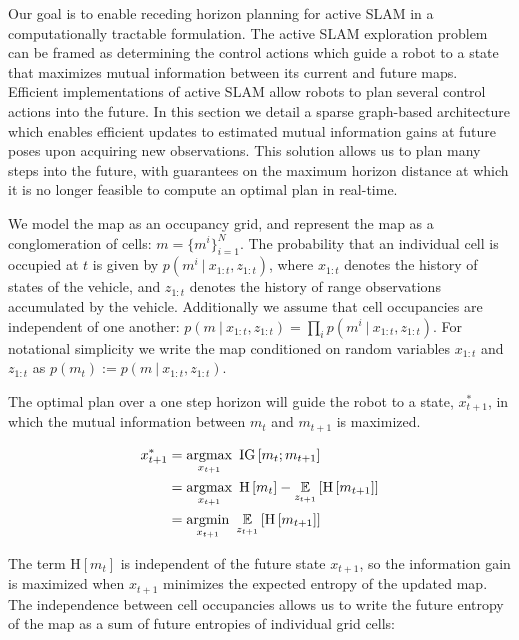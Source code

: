 \documentclass[conference]{IEEEtran}
\begin{document}
\iffalse
Our goal is to enable receding horizon planning for active SLAM in a computationally tractable formulation. The active SLAM exploration problem can be framed as determining the control actions which guide a robot to a state that maximizes mutual information between its current and future maps. Efficient implementations of active SLAM allow robots to plan several control actions into the future. In this section we detail a sparse graph-based architecture which enables efficient updates to estimated mutual information gains at future poses upon acquiring new observations. This solution allows us to plan many steps into the future, with guarantees on the maximum horizon distance at which it is no longer feasible to compute an optimal plan in real-time.

We model the map as an occupancy grid, and represent the map as a conglomeration of cells: $m = \{m^{i}\}_{i=1}^{N}$. The probability that an individual cell is occupied at $t$ is given by $p\left(m^{i} \ \vert \ x_{1:t}, z_{1:t}\right)$, where $x_{1:t}$ denotes the history of states of the vehicle, and $z_{1:t}$ denotes the history of range observations accumulated by the vehicle. Additionally we assume that cell occupancies  are independent of one another: $p\left(m \ \vert \ x_{1:t}, z_{1:t}\right) = \prod_{i} p\left(m^{i} \ \vert \ x_{1:t}, z_{1:t}\right)$. For notational simplicity we write the map conditioned on random variables $x_{1:t}$ and $z_{1:t}$ as $p\left(m_{t}\right) := p\left(m \ \vert \ x_{1:t}, z_{1:t}\right)$.

The optimal plan over a one step horizon will guide the robot to a state, $x_{t+1}^{*}$, in which the mutual information between $m_{t}$ and $m_{t+1}$ is maximized.

\begin{align} \begin{split}
  x_{t+1}^{*}
  &=
  \argmax_{x_{t+1}}
  \
  \text{IG}\left[
    m_{t}
    ;
    m_{t+1}
  \right]
  \\
  &=
  \argmax_{x_{t+1}}
  \
  \text{H}\left[
    m_{t}
  \right]
  -
  \expect_{z_{t+1}}\left[
    \text{H}\left[
      m_{t+1}
    \right]
  \right]
  \\
  &=
  \argmin_{x_{t+1}}
  \
  \expect_{z_{t+1}}\left[
    \text{H}\left[
      m_{t+1}
    \right]
  \right]
\end{split} \end{align}

The term $\text{H}\left[m_{t}\right]$ is independent of the future state $x_{t+1}$, so the information gain is maximized when $x_{t+1}$ minimizes the expected entropy of the updated map. The independence between cell occupancies allows us to write the future entropy of the map as a sum of future entropies of individual grid cells:
\end{document}
